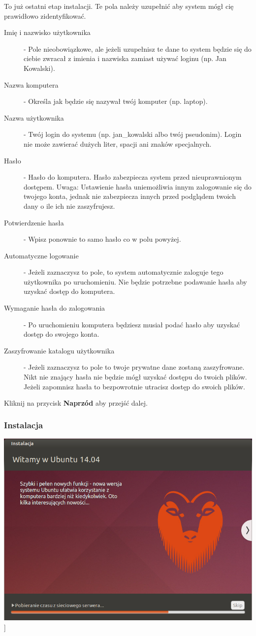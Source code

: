 To już ostatni etap instalacji. Te pola należy uzupełnić aby system mógł cię prawidłowo zidentyfikować.
\begin{description}
\item[Imię i nazwisko użytkownika] - Pole nieobowiązkowe, ale jeżeli uzupełnisz te dane to system będzie się do ciebie zwracał z imienia i nazwiska zamiast używać loginu (np. Jan Kowalski).
\item[Nazwa komputera] - Określa jak będzie się nazywał twój komputer (np. laptop).
\item[Nazwa użytkownika] - Twój login do systemu (np. jan\_kowalski albo twój pseudonim). Login nie może zawierać dużych liter, spacji ani znaków specjalnych.
\item[Hasło] - Hasło do komputera. Hasło zabezpiecza system przed nieuprawnionym dostępem. Uwaga: Ustawienie hasła uniemożliwia innym zalogowanie się do twojego konta, jednak nie zabezpiecza innych przed podglądem twoich dany o ile ich nie zaszyfrujesz. 
\item[Potwierdzenie hasła] - Wpisz ponownie to samo hasło co w polu powyżej.
\item[Automatyczne logowanie] - Jeżeli zaznaczysz to pole, to system automatycznie zaloguje tego użytkownika po uruchomieniu. Nie będzie potrzebne podawanie hasła aby uzyskać dostęp do komputera.
\item[Wymaganie hasła do zalogowania] - Po uruchomieniu komputera będziesz musiał podać hasło aby uzyskać dostęp do swojego konta.
\item[Zaszyfrowanie katalogu użytkownika] - Jeżeli zaznaczysz to pole to twoje prywatne dane zostaną zaszyfrowane. Nikt nie znający hasła nie będzie mógł uzyskać dostępu do twoich plików. Jeżeli zapomnisz hasła to bezpowrotnie utracisz dostęp do swoich plików.
\end{description}
\begin{flushright}
Kliknij na przycisk \textbf{Naprzód} aby przejść dalej.
\end{flushright}
\clearpage
\subsubsection{Instalacja}
\begin{center}
        \includegraphics[scale=0.5]{images/instalator_kopiowanie.png}]
\end{center}

